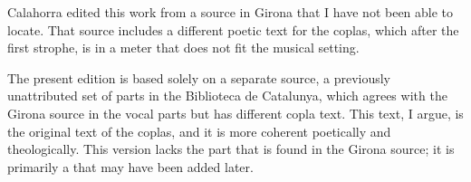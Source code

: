 \begin{notesources}
    \begin{source}
    \end{source}
    \begin{source}
    \end{source}
\end{notesources}

Calahorra edited this work from a source in Girona that I have not been able
to locate.
That source includes a different poetic text for the coplas, which after the
first strophe, is in a meter that does not fit the musical setting.

The present edition is based solely on a separate source, a previously
unattributed set of parts in the Biblioteca de Catalunya, which agrees with
the Girona source in the vocal parts but has different copla text.
This text, I argue, is the original text of the coplas, and it is more
coherent poetically and theologically.
This version lacks the  part that is found in the Girona
source; it is primarily a  that may have been added
later.

\endinput
